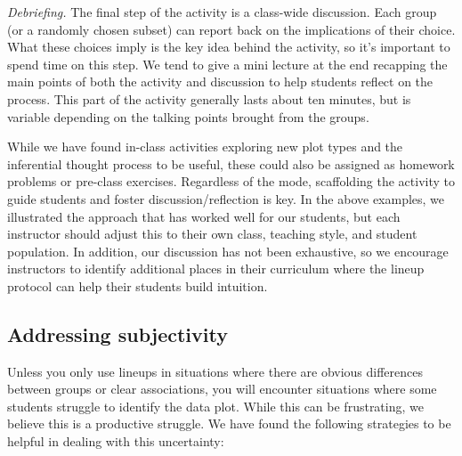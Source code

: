 \documentclass[12pt]{article}
\begin{document}
\emph{Debriefing.} The final step of the activity is a class-wide
discussion. Each group (or a randomly chosen subset) can report back on
the implications of their choice. What these choices imply is the key
idea behind the activity, so it's important to spend time on this step.
We tend to give a mini lecture at the end recapping the main points of
both the activity and discussion to help students reflect on the
process. This part of the activity generally lasts about ten minutes,
but is variable depending on the talking points brought from the groups.

While we have found in-class activities exploring new plot types and the
inferential thought process to be useful, these could also be assigned
as homework problems or pre-class exercises. Regardless of the mode,
scaffolding the activity to guide students and foster
discussion/reflection is key. In the above examples, we illustrated the
approach that has worked well for our students, but each instructor
should adjust this to their own class, teaching style, and student
population. In addition, our discussion has not been exhaustive, so we
encourage instructors to identify additional places in their curriculum
where the lineup protocol can help their students build intuition.

\hypertarget{addressing-subjectivity}{%
\subsection{Addressing subjectivity}\label{addressing-subjectivity}}

Unless you only use lineups in situations where there are obvious
differences between groups or clear associations, you will encounter
situations where some students struggle to identify the data plot. While
this can be frustrating, we believe this is a productive struggle. We
have found the following strategies to be helpful in dealing with this
uncertainty:
\end{document}
